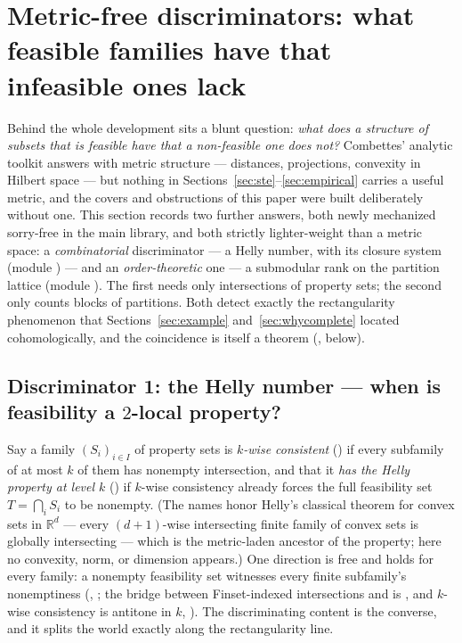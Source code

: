 \documentclass[11pt]{article}
\begin{document}
\section{Metric-free discriminators: what feasible families have
that infeasible ones lack}
\label{sec:discriminators}

Behind the whole development sits a blunt question: \emph{what does
a structure of subsets that is feasible have that a non-feasible one
does not?}  Combettes' analytic toolkit answers with metric
structure --- distances, projections, convexity in Hilbert space
\citep{combettes1993} --- but nothing in
Sections~\ref{sec:ste}--\ref{sec:empirical} carries a useful metric,
and the covers and obstructions of this paper were built
deliberately without one.  This section records two further answers,
both newly mechanized sorry-free in the main library, and both
strictly lighter-weight than a metric space: a \emph{combinatorial}
discriminator --- a Helly number, with its closure system (module
) --- and an \emph{order-theoretic} one
--- a submodular rank on the partition lattice (module
).  The first needs only intersections of
property sets; the second only counts blocks of partitions.  Both
detect exactly the rectangularity phenomenon that
Sections~\ref{sec:example} and~\ref{sec:whycomplete} located
cohomologically, and the coincidence is itself a theorem
(, below).

\subsection{Discriminator 1: the Helly number --- when is
feasibility a $2$-local property?}
\label{sec:helly}

Say a family $(S_i)_{i \in I}$ of property sets is \emph{$k$-wise
consistent} () if every subfamily of at most
$k$ of them has nonempty intersection, and that it \emph{has the
Helly property at level $k$} () if $k$-wise
consistency already forces the full feasibility set $T = \bigcap_i
S_i$ to be nonempty.  (The names honor Helly's classical theorem for
convex sets in $\mathbb{R}^d$ --- every $(d{+}1)$-wise intersecting
finite family of convex sets is globally intersecting --- which is
the metric-laden ancestor of the property; here no convexity, norm,
or dimension appears.)  One direction is free and holds for every
family: a nonempty feasibility set witnesses every finite
subfamily's nonemptiness
(,
; the bridge between
Finset-indexed intersections and  is
, and $k$-wise consistency is
antitone in $k$, ).  The discriminating
content is the converse, and it splits the world exactly along the
rectangularity line.
\end{document}
